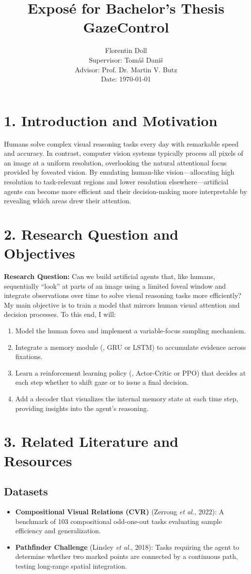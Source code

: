 \documentclass[12pt,a4paper]{article}
\title{Exposé for Bachelor's Thesis\\[1ex]
\large{GazeControl}}
\author{Florentin Doll\\
Supervisor: Tomáš Daniš\\
Advisor: Prof. Dr. Martin V. Butz\\
Date: \today}
\date{}
\begin{document}
\maketitle

\section*{1. Introduction and Motivation}
Humans solve complex visual reasoning tasks every day with remarkable speed and accuracy. In contrast, computer vision systems typically process all pixels of an image at a uniform resolution, overlooking the natural attentional focus provided by foveated vision. 
By emulating human-like vision—allocating high resolution to task-relevant regions and lower resolution elsewhere—artificial agents can become more efficient and their decision-making more interpretable by revealing which areas drew their attention.

\section*{2. Research Question and Objectives}
\textbf{Research Question:} Can we build artificial agents that, like humans, sequentially \enquote{look} at parts of an image using a limited foveal window and integrate observations over time to solve visual reasoning tasks more efficiently?\\
My main objective is to train a model that mirrors human visual attention and decision processes. To this end, I will:
\begin{enumerate}[label=\arabic*.]
  \item Model the human fovea and implement a variable-focus sampling mechanism.
  \item Integrate a memory module (\eg, GRU or LSTM) to accumulate evidence across fixations.
  \item Learn a reinforcement learning policy (\eg, Actor-Critic or PPO) that decides at each step whether to shift gaze or to issue a final decision.
  \item Add a decoder that visualizes the internal memory state at each time step, providing insights into the agent’s reasoning.
\end{enumerate}

\section*{3. Related Literature and Resources}
\subsection*{Datasets}
\begin{itemize}[leftmargin=*]
  \item \textbf{Compositional Visual Relations (CVR)} (Zerroug \emph{et al.}, 2022): A benchmark of 103 compositional odd-one-out tasks evaluating sample efficiency and generalization.
  \item \textbf{Pathfinder Challenge} (Linsley \emph{et al.}, 2018): Tasks requiring the agent to determine whether two marked points are connected by a continuous path, testing long-range spatial integration.
\end{itemize}
\end{document}
